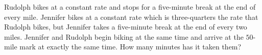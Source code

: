Rudolph bikes at a constant rate and stops for a five-minute break at the end of every mile. Jennifer bikes at a constant rate which is three-quarters the rate that Rudolph bikes, but Jennifer takes a five-minute break at the end of every two miles. Jennifer and Rudolph begin biking at the same time and arrive at the $ 50$-mile mark at exactly the same time. How many minutes has it taken them?